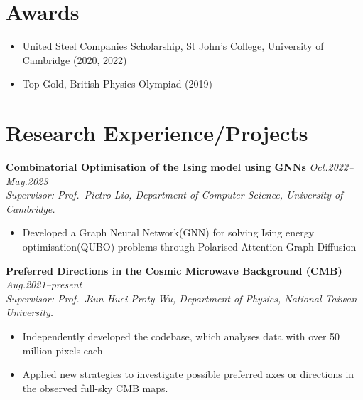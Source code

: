 \documentclass[11pt,a4paper,roman]{moderncv}        %
\begin{document}
\section{Awards}
\begin{itemize}
	\item United Steel Companies Scholarship, St John's College, University of Cambridge (2020, 2022)
	\item Top Gold, British Physics Olympiad (2019)
\end{itemize}



\section{Research Experience/Projects}

\textbf{Combinatorial Optimisation of the Ising model using GNNs} \hfill \textit{Oct.2022--May.2023}\\
\textit{Supervisor: Prof.\ Pietro Lio, Department of Computer Science, University of Cambridge.}
\begin{itemize}
	\item Developed a Graph Neural Network(GNN) for solving Ising energy optimisation(QUBO) problems through Polarised Attention Graph Diffusion
\end{itemize}
\vspace*{1mm}

\textbf{Preferred Directions in the Cosmic Microwave Background (CMB)} \hfill \textit{Aug.2021--present}\\
\textit{Supervisor: Prof.\ Jiun-Huei Proty Wu, Department of Physics, National Taiwan University.}
\begin{itemize}
	\item Independently developed the codebase, which analyses data with over 50 million pixels each
	\item Applied new strategies to investigate possible preferred axes or directions in the observed full-sky CMB maps.
\end{itemize}
\vspace*{1mm}
\end{document}
